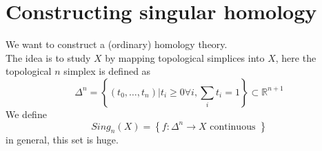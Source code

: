 \documentclass[../main.tex]{subfiles}
\begin{document}
\section{Constructing singular homology}
We want to construct a (ordinary) homology theory.\\
The idea is to study $X$ by mapping topological simplices into $X$, here the topological $n$ simplex is defined as
\[ 
\Delta^{n} = \left\{ ( t_0,\ldots,t_n) | t_i \geq 0\forall i, \sum_i t_i = 1  \right\} \subset \mathbb{R}^{n+1}
\]
We define
\[ 
Sing_n( X) = \left\{ f: \Delta^{n}\to X \text{ continuous }  \right\} 
\]
in general, this set is huge.
\end{document}
